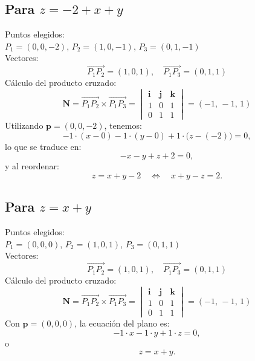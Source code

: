 \documentclass{article}
\begin{document}
\subsection{Para $z = -2 + x + y$}
Puntos elegidos: \\ 
$P_1 = (0,0,-2)$, $P_2 = (1,0,-1)$, $P_3 = (0,1,-1)$ \\[1mm]
Vectores:
\begin{equation*}
    \overrightarrow{P_1P_2} = (1,0,1), \quad \overrightarrow{P_1P_3} = (0,1,1)
\end{equation*}
Cálculo del producto cruzado:
\begin{equation*}
    \mathbf{N} = \overrightarrow{P_1P_2} \times \overrightarrow{P_1P_3} =
    \begin{vmatrix} 
    \mathbf{i} & \mathbf{j} & \mathbf{k} \\
    1 & 0 & 1 \\
    0 & 1 & 1
    \end{vmatrix} = (-1,\,-1,\,1)
\end{equation*}
Utilizando \( \mathbf{p} = (0,0,-2) \), tenemos:
\[
-1\cdot (x-0) - 1\cdot (y-0) + 1\cdot \bigl(z-(-2)\bigr)=0,
\]
lo que se traduce en:
\[
-x - y + z + 2 = 0,
\]
y al reordenar:
\[
z = x + y - 2 \quad \Longleftrightarrow \quad x+y-z=2.
\]

\subsection{Para $z = x + y$}
Puntos elegidos: \\ 
$P_1 = (0,0,0)$, $P_2 = (1,0,1)$, $P_3 = (0,1,1)$ \\[1mm]
Vectores:
\begin{equation*}
    \overrightarrow{P_1P_2} = (1,0,1), \quad \overrightarrow{P_1P_3} = (0,1,1)
\end{equation*}
Cálculo del producto cruzado:
\begin{equation*}
    \mathbf{N} = \overrightarrow{P_1P_2} \times \overrightarrow{P_1P_3} =
    \begin{vmatrix} 
    \mathbf{i} & \mathbf{j} & \mathbf{k} \\
    1 & 0 & 1 \\
    0 & 1 & 1
    \end{vmatrix} = (-1,\,-1,\,1)
\end{equation*}
Con \( \mathbf{p} = (0,0,0) \), la ecuación del plano es:
\[
-1\cdot x - 1\cdot y + 1\cdot z = 0,
\]
o
\[
z = x + y.
\]
\end{document}

